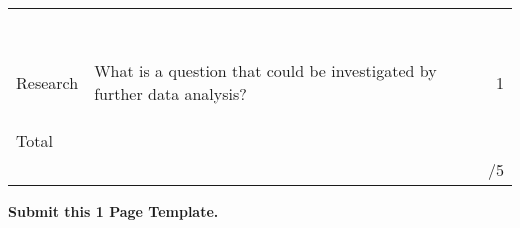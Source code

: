 \documentclass[bigtut]{quiz}\usepackage[]{graphicx}\usepackage[]{color}
\begin{document}
\begin{tutorial}
\begin{tabular}{|l|l|r|}
& & \\ 
& & \\ 
& & \\ 
& & \\ 
& & \\ 
& & \\ 
& & \\ 
& & \\\hline
Research & {\tiny What is a question that could be investigated by further data analysis?} & 1 \\
& & \\
& & \\
& & \\ \hline
Total & &  \\ 
& & /5 \\ \hline
\end{tabular}

\newpage
{}  {\tiny \bf  Submit this 1 Page Template.}


\end{tutorial}
\end{document}
